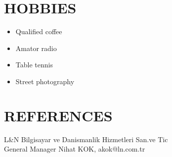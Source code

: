 \documentclass[10pt]{article}
\begin{document}
\section{HOBBIES}
 \begin{itemize}
 \justifying
   
\itemsep0em
\item Qualified coffee
\item    Amator radio
\item     Table tennis
 \item    Street photography




\end{itemize} 
\section{REFERENCES}

L\&N Bilgisayar ve Danismanlik Hizmetleri San.ve Tic \\
General Manager Nihat KOK, akok@ln.com.tr
\end{document}
